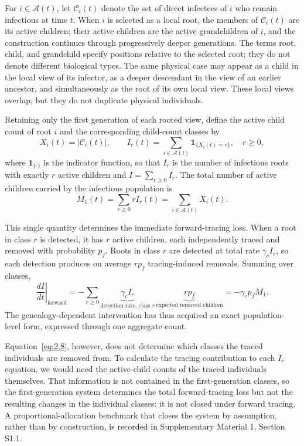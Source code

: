 \documentclass[review,12pt]{elsarticle}
\numberwithin{equation}{section}
\theoremstyle{remark}
\begin{document}
For $i\in\mathcal A(t)$, let $\mathcal C_i(t)$ denote the set of direct infectees of $i$ who remain infectious at time $t$. When $i$ is selected as a local root, the members of $\mathcal C_i(t)$ are its active children; their active children are the active grandchildren of $i$, and the construction continues through progressively deeper generations. The terms root, child, and grandchild specify positions relative to the selected root; they do not denote different biological types. The same physical case may appear as a child in the local view of its infector, as a deeper descendant in the view of an earlier ancestor, and simultaneously as the root of its own local view. These local views overlap, but they do not duplicate physical individuals.

Retaining only the first generation of each rooted view, define the active child count of root $i$ and the corresponding child-count classes by
\begin{equation}
X_i(t) = |\mathcal C_i(t)|, \qquad
I_r(t) = \sum_{i\in\mathcal A(t)} \mathbf 1_{\{X_i(t)=r\}}, \quad r\geq0,
\label{eq:2.3}
\end{equation}
where $\mathbf 1_{\{\cdot\}}$ is the indicator function, so that $I_r$ is the number of infectious roots with exactly $r$ active children and $I=\sum_{r\geq0}I_r$. The total number of active children carried by the infectious population is
\begin{equation}
M_1(t) = \sum_{r\geq0} r I_r(t) = \sum_{i\in\mathcal A(t)} X_i(t).
\label{eq:2.7}
\end{equation}

This single quantity determines the immediate forward-tracing loss. When a root in class $r$ is detected, it has $r$ active children, each independently traced and removed with probability $p_f$. Roots in class $r$ are detected at total rate $\gamma_c I_r$, so each detection produces on average $rp_f$ tracing-induced removals. Summing over classes,
\begin{equation}
\left.\frac{dI}{dt}\right|_{\text{forward}} = -\sum_{r\geq0} \underbrace{\gamma_c I_r}_{\text{detection rate, class }r}\, \underbrace{r p_f}_{\text{expected removed children}} = -\gamma_c p_f M_1.
\label{eq:2.8}
\end{equation}
The genealogy-dependent intervention has thus acquired an exact population-level form, expressed through one aggregate count.

Equation~\eqref{eq:2.8}, however, does not determine which classes the traced individuals are removed from. To calculate the tracing contribution to each $I_r$ equation, we would need the active-child counts of the traced individuals themselves. That information is not contained in the first-generation classes, so the first-generation system determines the total forward-tracing loss but not the resulting changes in the individual classes: it is not closed under forward tracing. A proportional-allocation benchmark that closes the system by assumption, rather than by construction, is recorded in Supplementary Material 1, Section S1.1.
\end{document}
